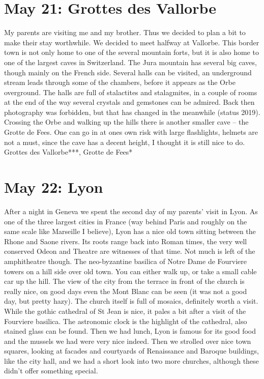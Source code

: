 \section{May 21: Grottes des Vallorbe}
\label{Vallorbe2011}

My parents are visiting me and my brother. Thus we decided to plan a bit to make their stay worthwhile. We decided to meet halfway at Vallorbe. This border town is not only home to one of the several mountain forts, but it is also home to one of the largest caves in Switzerland. The Jura mountain has several big caves, though mainly on the French side. Several halls can be visited, an underground stream leads through some of the chambers, before it appears as the Orbe overground. The halls are full of stalactites and stalagmites, in a couple of rooms at the end of the way several crystals and gemstones can be admired. Back then photography was forbidden, but that has changed in the meanwhile (status 2019). Crossing the Orbe and walking up the hills there is another smaller cave -- the Grotte de Fees. One can go in at ones own risk with large flashlights, helmets are not a must, since the cave has a decent height, I thought it is still nice to do.\\

Grottes des Vallorbe***, Grotte de Fees*

\section{May 22: Lyon}
\label{Lyon2011}

After a night in Geneva we spent the second day of my parents' visit in Lyon. As one of the three largest cities in France (way behind Paris and roughly on the same scale like Marseille I believe), Lyon has a nice old town sitting between the Rhone and Saone rivers. Its roots range back into Roman times, the very well conserved Odeon and Theatre are witnesses of that time. Not much is left of the amphitheatre though. The neo-byzantine basilica of Notre Dame de Fourviere towers on a hill side over old town. You can either walk up, or take a small cable car up the hill. The view of the city from the terrace in front of the church is really nice, on good days even the Mont Blanc can be seen (it was not a good day, but pretty hazy). The church itself is full of mosaics, definitely worth a visit. While the gothic cathedral of St Jean is nice, it pales a bit after a visit of the Fourviere basilica. The astronomic clock is the highlight of the cathedral, also stained glass can be found. Then we had lunch, Lyon is famous for its good food and the mussels we had were very nice indeed. Then we strolled over nice town squares, looking at facades and courtyards of Renaissance and Baroque buildings, like the city hall, and we had a short look into two more churches, although these didn't offer something special.\\

